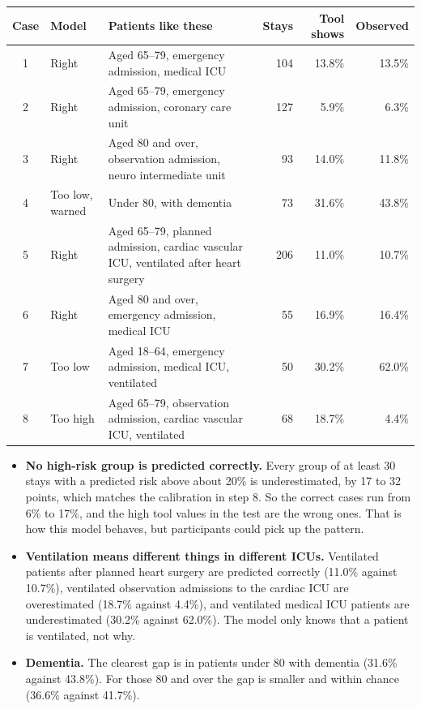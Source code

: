 \documentclass[11pt]{article}
\begin{document}
\begin{center}
\small
\begin{tabularx}{\textwidth}{c l X r r r}
	\toprule
	Case & Model & Patients like these & Stays & Tool shows & Observed \\
	\midrule
	1 & Right & Aged 65--79, emergency admission, medical ICU & 104 & 13.8\% & 13.5\% \\
	2 & Right & Aged 65--79, emergency admission, coronary care unit & 127 & 5.9\% & 6.3\% \\
	3 & Right & Aged 80 and over, observation admission, neuro intermediate unit & 93 & 14.0\% & 11.8\% \\
	4 & Too low, warned & Under 80, with dementia & 73 & 31.6\% & 43.8\% \\
	5 & Right & Aged 65--79, planned admission, cardiac vascular ICU, ventilated after heart surgery & 206 & 11.0\% & 10.7\% \\
	6 & Right & Aged 80 and over, emergency admission, medical ICU & 55 & 16.9\% & 16.4\% \\
	7 & Too low & Aged 18--64, emergency admission, medical ICU, ventilated & 50 & 30.2\% & 62.0\% \\
	8 & Too high & Aged 65--79, observation admission, cardiac vascular ICU, ventilated & 68 & 18.7\% & 4.4\% \\
	\bottomrule
\end{tabularx}
\end{center}

\begin{itemize}
	\item \textbf{No high-risk group is predicted correctly.} Every group of at least 30 stays with a predicted risk above about 20\% is underestimated, by 17 to 32 points, which matches the calibration in step 8. So the correct cases run from 6\% to 17\%, and the high tool values in the test are the wrong ones. That is how this model behaves, but participants could pick up the pattern.
	\item \textbf{Ventilation means different things in different ICUs.} Ventilated patients after planned heart surgery are predicted correctly (11.0\% against 10.7\%), ventilated observation admissions to the cardiac ICU are overestimated (18.7\% against 4.4\%), and ventilated medical ICU patients are underestimated (30.2\% against 62.0\%). The model only knows that a patient is ventilated, not why.
	\item \textbf{Dementia.} The clearest gap is in patients under 80 with dementia (31.6\% against 43.8\%). For those 80 and over the gap is smaller and within chance (36.6\% against 41.7\%).
\end{itemize}
\end{document}
